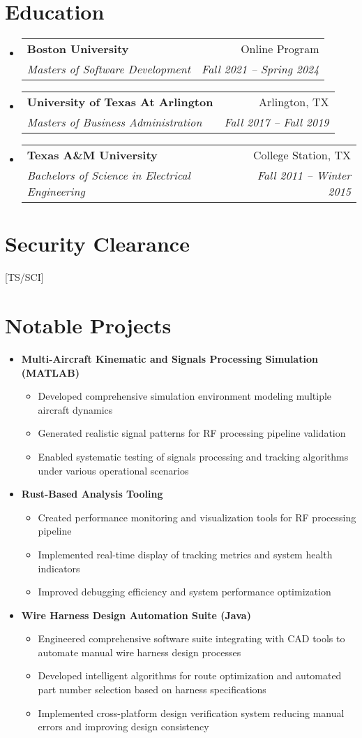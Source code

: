 \documentclass[11pt,a4paper]{article}
\makeatletter
\newcommand{\resumeItem}[1]{
  \item\small{#1}
}
\newcommand{\resumeSubheading}[4]{
  \vspace{-2pt}\item
    \begin{tabular*}{0.97\textwidth}[t]{l@{\extracolsep{\fill}}r}
      \textbf{#1} & #2 \\
      \textit{\small#3} & \textit{\small #4} \\
    \end{tabular*}\vspace{-7pt}
}
\makeatother
\begin{document}
\section{Education}
\begin{itemize}[leftmargin=0.15in, label={}]
    \resumeSubheading
      {Boston University}{Online Program}
      {Masters of Software Development}{Fall 2021 -- Spring 2024}
    \resumeSubheading
      {University of Texas At Arlington}{Arlington, TX}
      {Masters of Business Administration}{Fall 2017 -- Fall 2019}
    \resumeSubheading
      {Texas A\&M University}{College Station, TX}
      {Bachelors of Science in Electrical Engineering}{Fall 2011 -- Winter 2015}
\end{itemize}

\section{Security Clearance}
[TS/SCI]

\section{Notable Projects}
\begin{itemize}[leftmargin=0.15in, label={}]
    \item \textbf{Multi-Aircraft Kinematic and Signals Processing Simulation (MATLAB)}
    \begin{itemize}[leftmargin=0.15in]
        \resumeItem{Developed comprehensive simulation environment modeling multiple aircraft dynamics}
        \resumeItem{Generated realistic signal patterns for RF processing pipeline validation}
        \resumeItem{Enabled systematic testing of signals processing and tracking algorithms under various operational scenarios}
    \end{itemize}
    
    \item \textbf{Rust-Based Analysis Tooling}
    \begin{itemize}[leftmargin=0.15in]
        \resumeItem{Created performance monitoring and visualization tools for RF processing pipeline}
        \resumeItem{Implemented real-time display of tracking metrics and system health indicators}
        \resumeItem{Improved debugging efficiency and system performance optimization}
    \end{itemize}

    \item \textbf{Wire Harness Design Automation Suite (Java)}
    \begin{itemize}[leftmargin=0.15in]
        \resumeItem{Engineered comprehensive software suite integrating with CAD tools to automate manual wire harness design processes}
        \resumeItem{Developed intelligent algorithms for route optimization and automated part number selection based on harness specifications}
        \resumeItem{Implemented cross-platform design verification system reducing manual errors and improving design consistency}
    \end{itemize}
\end{itemize}
\end{document}
